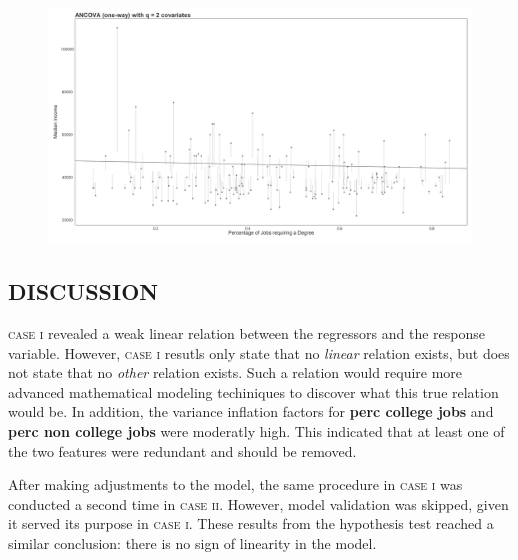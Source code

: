 \documentclass[10pt, twoside, openleft]{article}
\begin{document}
\begin{figure}[H]
\centering
\includegraphics[scale=0.365]{plot4}
\caption{}
\end{figure}

\begin{center}
\section{DISCUSSION}
\vspace{-3ex}
\end{center}

\noindent
\textsc{case i} revealed a weak linear relation between the regressors and
the response variable. However, \textsc{case i} resutls only
state that no \emph{linear} relation exists, but does not state that
no \emph{other} relation exists. Such a relation would require more advanced
mathematical modeling techiniques to discover what this true relation would be.
In addition, the variance inflation factors for \textbf{perc college jobs}
and \textbf{perc non college jobs} were moderatly high. This indicated that at
least one of the two features were redundant and should be removed.
\smallskip

After making adjustments to the model, the same procedure in \textsc{case i}
was conducted a second time in \textsc{case ii}. However, model validation was
skipped, given it served its purpose in \textsc{case i}. These results from the
hypothesis test reached a similar conclusion: there is no sign of linearity in
the model.
\end{document}
